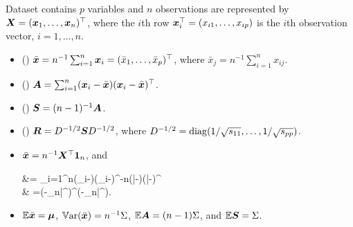 \documentclass[10pt,a4paper]{book}
\begin{document}
\begin{defbox}{}
	\begin{definition}\label{def:sample_mean_etc}
		Dataset contains $p$ variables and $n$ observations are represented by 
		${\boldsymbol X} = ({\boldsymbol x}_{1},\ldots,{\boldsymbol x}_n)^\top$, where the $i$th row ${\boldsymbol x}_i^\top=(x_{i1},\ldots,x_{ip})$ is the $i$th observation vector, $i=1,\ldots,n$. 
		\begin{itemize}
			\item () $\bar{{\boldsymbol x}}=n^{-1}\sum_{i=1}^{n}{\boldsymbol x}_i=(\bar{x}_1,\ldots,\bar{x}_p)^\top$, where $\bar{x}_j=n^{-1}\sum_{i=1}^{n}x_{ij}$.
			\item () ${\boldsymbol A}=\sum_{i=1}^{n}({\boldsymbol x}_i-\bar{{\boldsymbol x}})({\boldsymbol x}_i-\bar{{\boldsymbol x}})^\top$.
			\item () ${\boldsymbol S}=(n-1)^{-1}{\boldsymbol A}$.
			\item () ${\boldsymbol R}=D^{-1/2}{\boldsymbol S} D^{-1/2}$, where $D^{-1/2}=\mathrm{diag}(1/\sqrt{s_{11}},\ldots,1/\sqrt{s_{pp}})$.
		\end{itemize}
	\end{definition}
\end{defbox}
\begin{itemize}
	\item $\bar{{\boldsymbol x}}=n^{-1}{\boldsymbol X}^\top{\boldsymbol 1}_n$, and
	\begin{sequation*}
		\begin{aligned}
			\A&= \sum_{i=1}^{n}(\x_i-\bam)(\x_i-\bam)^\TT-n(\bar{\x}-\bam)(\bar{\x}-\bam)^\TT \\ & =(\X-\1_n\bar{\x}^\TT)^\TT(\X-\1_n\bar{\x}^\TT)\succeq \0.
		\end{aligned}
	\end{sequation*}
	\item $\mathbb E\bar{{\boldsymbol x}}={\boldsymbol\mu}$, $\mathbb{V}\mathrm{ar}(\bar{{\boldsymbol x}})=n^{-1}\Sigma$, $\mathbb E {\boldsymbol A}=(n-1)\Sigma$, and $\mathbb E {\boldsymbol S}=\Sigma$.
\end{itemize}
\end{document}
